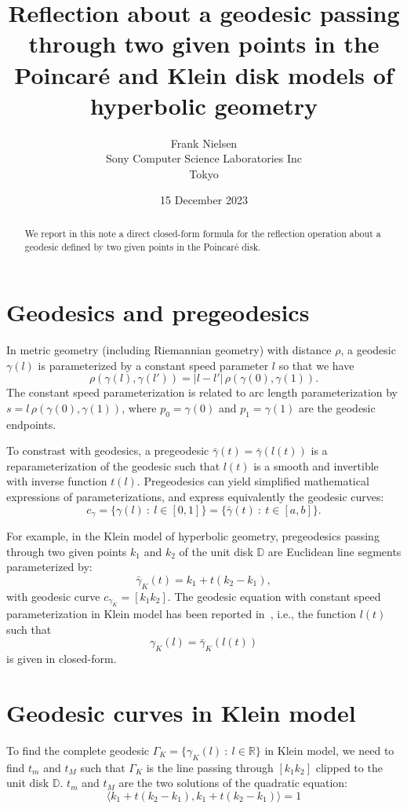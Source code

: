 \documentclass{article}
\title{Reflection about a geodesic passing through two given points in the Poincar\'e and Klein disk  models of hyperbolic geometry}
\author{Frank Nielsen\\ Sony Computer Science Laboratories Inc\\ Tokyo }
\date{15 December 2023}
\def\st{{\ :\ }}
\def\bbR{\mathbb{R}}
\def\bbD{\mathbb{D}}
\def\inner#1#2{\langle #1,#2\rangle}
\begin{document}
\maketitle

\begin{abstract}
We report in this note a direct closed-form formula for the reflection operation about a geodesic defined by two given points  in the Poincar\'e disk.
\end{abstract}

\section{Geodesics and pregeodesics}

In metric geometry (including Riemannian geometry) with distance $\rho$, a geodesic $\gamma(l)$ is parameterized by a constant speed parameter $l$ so that we have 
$$
\rho(\gamma(l),\gamma(l'))=|l-l'|\, \rho(\gamma(0),\gamma(1)).
$$
The constant speed parameterization is related to arc length parameterization by $s=l\,\rho(\gamma(0),\gamma(1))$, where $p_0=\gamma(0)$ and $p_1=\gamma(1)$ are the geodesic endpoints.

To constrast with geodesics, a pregeodesic $\bar\gamma(t)=\bar\gamma(l(t))$ is a reparameterization of the geodesic such that $l(t)$ is a smooth and invertible with inverse function $t(l)$. Pregeodesics can yield simplified mathematical expressions of parameterizations, and express equivalently the geodesic curves:
$$
c_\gamma=\{\gamma(l) \st l\in [0,1]\} = \{\bar\gamma(t) \st t\in [a,b]\}.
$$

For example, in the Klein model of hyperbolic geometry, pregeodesics passing through two given points $k_1$ and $k_2$ of the unit disk $\bbD$ are Euclidean line segments parameterized by:
$$
\bar\gamma_K(t)=k_1+t(k_2-k_1),
$$
with geodesic curve $c_{\gamma_K}=[k_1k_2]$.
The geodesic equation with constant speed parameterization in Klein model has been reported in~\cite{nielsen2012hyperbolic}, i.e., the function $l(t)$ such that
$$
\gamma_K(l)=\bar\gamma_K(l(t))
$$
is given in closed-form.

\section{Geodesic curves in Klein model}

To find the complete geodesic $\Gamma_K=\{\gamma_K(l) \st l\in\bbR\}$ in Klein model, we need to find $t_m$ and $t_M$ such that $\Gamma_K$ is the line passing through $[k_1k_2]$ clipped to the unit disk $\bbD$.
$t_m$ and $t_M$ are the two solutions of the quadratic equation:
$$
\inner{k_1+t(k_2-k_1)}{k_1+t(k_2-k_1)}=1
$$
\end{document}
